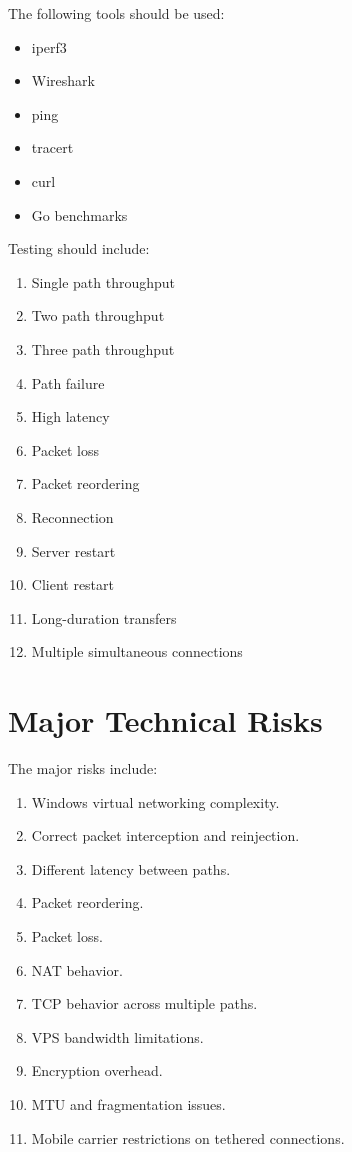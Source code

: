 \documentclass[12pt,a4paper]{article}
\begin{document}
The following tools should be used:

\begin{itemize}
    \item iperf3
    \item Wireshark
    \item ping
    \item tracert
    \item curl
    \item Go benchmarks
\end{itemize}

Testing should include:

\begin{enumerate}
    \item Single path throughput
    \item Two path throughput
    \item Three path throughput
    \item Path failure
    \item High latency
    \item Packet loss
    \item Packet reordering
    \item Reconnection
    \item Server restart
    \item Client restart
    \item Long-duration transfers
    \item Multiple simultaneous connections
\end{enumerate}


\section{Major Technical Risks}

The major risks include:

\begin{enumerate}
    \item Windows virtual networking complexity.
    \item Correct packet interception and reinjection.
    \item Different latency between paths.
    \item Packet reordering.
    \item Packet loss.
    \item NAT behavior.
    \item TCP behavior across multiple paths.
    \item VPS bandwidth limitations.
    \item Encryption overhead.
    \item MTU and fragmentation issues.
    \item Mobile carrier restrictions on tethered connections.
\end{enumerate}
\end{document}
